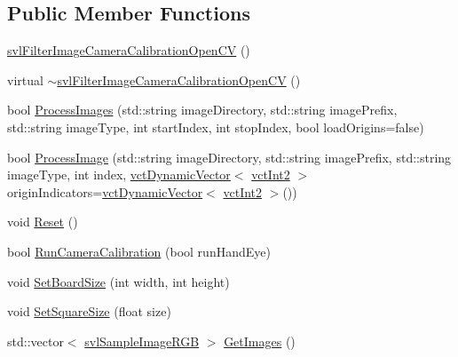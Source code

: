 \subsection*{Public Member Functions}
\begin{DoxyCompactItemize}
\item 
\hyperlink{classsvl_filter_image_camera_calibration_open_c_v_a2c77f9c063629d0fc149f7859f4e7e52}{svl\+Filter\+Image\+Camera\+Calibration\+Open\+C\+V} ()
\item 
virtual \hyperlink{classsvl_filter_image_camera_calibration_open_c_v_a2940bbcf67c365243f6da2a74c4a3e30}{$\sim$svl\+Filter\+Image\+Camera\+Calibration\+Open\+C\+V} ()
\item 
bool \hyperlink{classsvl_filter_image_camera_calibration_open_c_v_aae42bf360aec857e17a74c7f1a44a04a}{Process\+Images} (std\+::string image\+Directory, std\+::string image\+Prefix, std\+::string image\+Type, int start\+Index, int stop\+Index, bool load\+Origins=false)
\item 
bool \hyperlink{classsvl_filter_image_camera_calibration_open_c_v_adced02ce6b00c6432f3d688e9ba65dd2}{Process\+Image} (std\+::string image\+Directory, std\+::string image\+Prefix, std\+::string image\+Type, int index, \hyperlink{classvct_dynamic_vector}{vct\+Dynamic\+Vector}$<$ \hyperlink{vct_fixed_size_vector_types_8h_add8c88eb6a432b15f14b866b9c35325f}{vct\+Int2} $>$ origin\+Indicators=\hyperlink{classvct_dynamic_vector}{vct\+Dynamic\+Vector}$<$ \hyperlink{vct_fixed_size_vector_types_8h_add8c88eb6a432b15f14b866b9c35325f}{vct\+Int2} $>$())
\item 
void \hyperlink{classsvl_filter_image_camera_calibration_open_c_v_a567fe0a64ab133e3667c30f709265d3f}{Reset} ()
\item 
bool \hyperlink{classsvl_filter_image_camera_calibration_open_c_v_adc5b1f785c44fe4c16cf8c2398482230}{Run\+Camera\+Calibration} (bool run\+Hand\+Eye)
\item 
void \hyperlink{classsvl_filter_image_camera_calibration_open_c_v_ad8ad3ebc89b4f29773c53e854d5368b6}{Set\+Board\+Size} (int width, int height)
\item 
void \hyperlink{classsvl_filter_image_camera_calibration_open_c_v_a2cdde4ac83f9b6f48e8d94b3ab029665}{Set\+Square\+Size} (float size)
\item 
std\+::vector$<$ \hyperlink{svl_sample_image_types_8h_a54a55112dd3879f71f990d2945375f1a}{svl\+Sample\+Image\+R\+G\+B} $>$ \hyperlink{classsvl_filter_image_camera_calibration_open_c_v_ae328c3abd7409b2afcc8f1c557cee603}{Get\+Images} ()
\item 

\end{DoxyCompactItemize}
